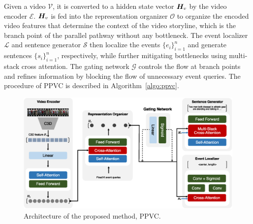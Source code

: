 Given a video $\mathcal{V}$, it is converted to a hidden state vector $\bm{H}_v$ by the video encoder $\mathcal{E}$.
$\bm{H}_v$ is fed into the representation organizer $\mathcal{O}$ to organize the encoded video features that determine the context of the video storyline, which is the branch point of the parallel pathway without any bottleneck.
The event localizer $\mathcal{L}$ and sentence generator $\mathcal{S}$ then localize the events $\{e_i\}_{i=1}^{n}$ and generate sentences $\{s_i\}_{i=1}^{n}$, respectively, while further mitigating bottlenecks using multi-stack cross attention.
The gating network $\mathcal{G}$ controls the flow at branch points and refines information by blocking the flow of unnecessary event queries.
The procedure of PPVC is described in Algorithm~\ref{algo:ppvc}.

\begin{figure}
  \centering
   \includegraphics[width=\linewidth]{figures/ppvc_fig2}
   \caption{
    Architecture of the proposed method, PPVC.
   }
  \label{fig:architecture}
\end{figure}


